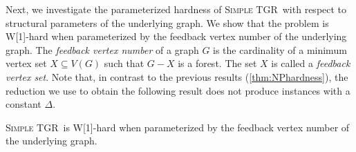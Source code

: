 \documentclass[a4paper,UKenglish,cleveref, autoref, thm-restate,anonymous]{lipics-v2021}
\newcommand{\deltaExact}{\textsc{Simple TGR}}
\begin{document}

Next, we investigate the parameterized hardness of \deltaExact\ with respect to structural parameters of the underlying graph. We show that the problem is W[1]-hard when parameterized by the feedback vertex number of the underlying graph. 
The \emph{feedback vertex number} of a graph $G$ is the cardinality of a minimum vertex set $X\subseteq V(G)$ such that $G-X$ is a forest. The set $X$ is called a \emph{feedback vertex set}. 
Note that, in contrast to the previous results (\cref{thm:NPhardness}), the reduction we use to obtain the following result does not produce instances with a constant $\Delta$.

\begin{theorem}[$\star$]\label{thm:W1wrtFVS}
    \deltaExact\ is W[1]-hard when parameterized by the feedback vertex number of the underlying graph.
\end{theorem}
\end{document}
